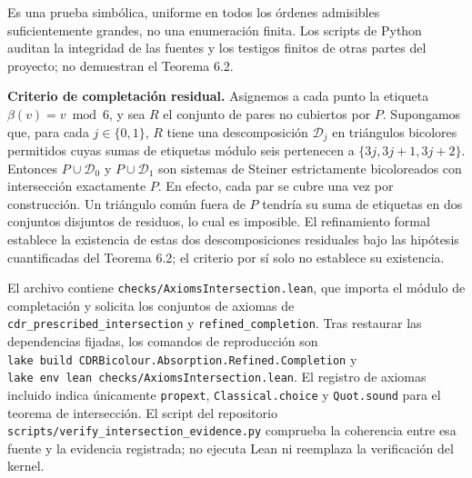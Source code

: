 \documentclass[spanish,11pt,a4paper]{article}
\begin{document}
Es una prueba simbólica, uniforme en todos los órdenes admisibles suficientemente grandes, no una enumeración finita. Los scripts de Python auditan la integridad de las fuentes y los testigos finitos de otras partes del proyecto; no demuestran el Teorema 6.2.

\textbf{Criterio de completación residual.} Asignemos a cada punto la etiqueta \(\beta(v)=v\bmod6\), y sea \(R\) el conjunto de pares no cubiertos por \(P\). Supongamos que, para cada \(j\in\{0,1\}\), \(R\) tiene una descomposición \(\mathcal D_j\) en triángulos bicolores permitidos cuyas sumas de etiquetas módulo seis pertenecen a \(\{3j,3j+1,3j+2\}\). Entonces \(P\cup\mathcal D_0\) y \(P\cup\mathcal D_1\) son sistemas de Steiner estrictamente bicoloreados con intersección exactamente \(P\). En efecto, cada par se cubre una vez por construcción. Un triángulo común fuera de \(P\) tendría su suma de etiquetas en dos conjuntos disjuntos de residuos, lo cual es imposible. El refinamiento formal establece la existencia de estas dos descomposiciones residuales bajo las hipótesis cuantificadas del Teorema 6.2; el criterio por sí solo no establece su existencia.

El archivo contiene \texttt{checks/\allowbreak{}Axioms\allowbreak{}Intersection.\allowbreak{}lean}, que importa el módulo de completación y solicita los conjuntos de axiomas de \texttt{cdr\_\allowbreak{}prescribed\_\allowbreak{}intersection} y \texttt{refined\_\allowbreak{}completion}. Tras restaurar las dependencias fijadas, los comandos de reproducción son \texttt{lake\ build\ CDRBicolour.\allowbreak{}Absorption.\allowbreak{}Refined.\allowbreak{}Completion} y \texttt{lake\ env\ lean\ checks/\allowbreak{}Axioms\allowbreak{}Intersection.\allowbreak{}lean}. El registro de axiomas incluido indica únicamente \texttt{propext}, \texttt{Classical.\allowbreak{}choice} y \texttt{Quot.\allowbreak{}sound} para el teorema de intersección. El script del repositorio \texttt{scripts/\allowbreak{}verify\_\allowbreak{}intersection\_\allowbreak{}evidence.\allowbreak{}py} comprueba la coherencia entre esa fuente y la evidencia registrada; no ejecuta Lean ni reemplaza la verificación del kernel.
\end{document}
